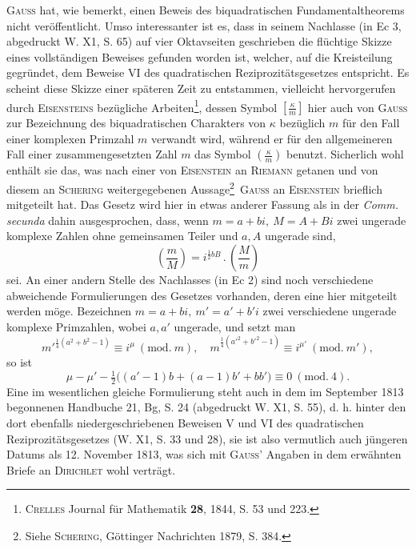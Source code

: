 \textsc{Gauss} hat, wie bemerkt, einen Beweis des biquadratischen Fundamentaltheorems nicht veröffentlicht. Umso interessanter ist es, dass in seinem Nachlasse (in Ec 3, abgedruckt W. X1, S. 65) auf vier Oktavseiten geschrieben die flüchtige Skizze eines vollständigen Beweises gefunden worden ist, welcher, auf die Kreisteilung gegründet, dem Beweise VI des quadratischen Reziprozitätsgesetzes entspricht. Es scheint diese Skizze einer späteren Zeit zu entstammen, vielleicht hervorgerufen durch \textsc{Eisensteins} bezügliche Arbeiten\footnote{\textsc{Crelles} Journal für Mathematik \textbf{28}, 1844, S. 53 und 223.}, dessen Symbol \(\left[\frac{\kappa}{m}\right]\) hier auch von \textsc{Gauss} zur Bezeichnung des biquadratischen Charakters von \(\kappa\) bezüglich \(m\) für den Fall einer komplexen Primzahl \(m\) verwandt wird, während er für den allgemeineren Fall einer zusammengesetzten Zahl \(m\) das Symbol \(\left(\frac{\kappa}{m}\right)\) benutzt. Sicherlich wohl enthält sie das, was nach einer von \textsc{Eisenstein} an \textsc{Riemann} getanen und von diesem an \textsc{Schering} weitergegebenen Aussage\begingroup\renewcommand{\thefootnote}{**)}\footnote{Siehe \textsc{Schering}, Göttinger Nachrichten 1879, S. 384.}\endgroup\ \textsc{Gauss} an \textsc{Eisenstein} brieflich mitgeteilt hat. Das Gesetz wird hier in etwas anderer Fassung als in der \textit{Comm. secunda} dahin ausgesprochen, dass, wenn \(m=a+bi,\ M=A+Bi\) zwei ungerade komplexe Zahlen ohne gemeinsamen Teiler und \(a,A\) ungerade sind,
\[
\left(\frac{m}{M}\right)=i^{\frac12 bB}\mathbin{.}\left(\frac{M}{m}\right)
\]
sei. An einer andern Stelle des Nachlasses (in Ec 2) sind noch verschiedene abweichende Formulierungen des Gesetzes vorhanden, deren eine hier mitgeteilt werden möge. Bezeichnen \(m=a+bi,\ m'=a'+b'i\) zwei verschiedene ungerade komplexe Primzahlen, wobei \(a,a'\) ungerade, und setzt man
\[
m'^{\frac14(a^2+b^2-1)}\equiv i^\mu\ (\mathrm{mod.}\ m),\quad m^{\frac14(a'^2+b'^2-1)}\equiv i^{\mu'}\ (\mathrm{mod.}\ m'),
\]
so ist
\[
\mu-\mu'-\tfrac12\bigl((a'-1)b+(a-1)b'+bb'\bigr)\equiv0\ (\mathrm{mod.}\ 4).
\]
\newpage{}
\noindent\hspace*{\parindent}Eine im wesentlichen gleiche Formulierung steht auch in dem im September 1813 begonnenen Handbuche 21, Bg, S. 24 (abgedruckt W. X1, S. 55), d. h. hinter den dort ebenfalls niedergeschriebenen Beweisen V und VI des quadratischen Reziprozitätsgesetzes (W. X1, S. 33 und 28), sie ist also vermutlich auch jüngeren Datums als 12. November 1813, was sich mit \textsc{Gauss}’ Angaben in dem erwähnten Briefe an \textsc{Dirichlet} wohl verträgt.
